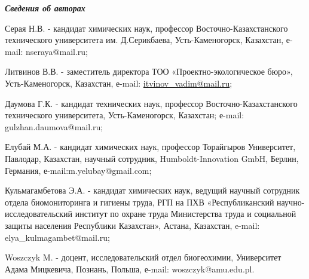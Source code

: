 \emph{{\bfseries Сведения об авторах}}

Серая Н.В. - кандидат химических наук, профессор Восточно-Казахстанского
технического университета им. Д.Серикбаева, Усть-Каменогорск, Казахстан,
е-mail: nseraya@mail.ru;

Литвинов В.В. - заместитель директора ТОО «Проектно-экологическое бюро»,
Усть-Каменогорск, Казахстан, е-mail:
\href{mailto:litvinov_vadim@mail.ru}{itvinov\_vadim@mail.ru};

Даумова Г.К. - кандидат технических наук, профессор
Восточно-Казахстанского технического университета, Усть-Каменогорск,
Казахстан; е-mail:
gulzhan.daumova@mail.ru;

Елубай М.А. - кандидат химических наук, профессор Торайгыров
Университет, Павлодар, Казахстан, научный сотрудник, Humboldt-Innovation
GmbH, Берлин, Германия, е-mail:m.yelubay@gmail.com;

Кульмагамбетова Э.А. - кандидат химических наук, ведущий научный
сотрудник отдела биомониторинга и гигиены труда, РГП на ПХВ
«Республиканский научно-исследовательский институт по охране труда
Министерства труда и социальной защиты населения Республики Казахстан»,
Астана, Казахстан, e-mail:
elya_kulmagambet@mail.ru;

Woszczyk M. - доцент, исследовательский отдел биогеохимии, Университет
Адама Мицкевича, Познань, Польша, е-mail:
woszczyk@amu.edu.pl.\

